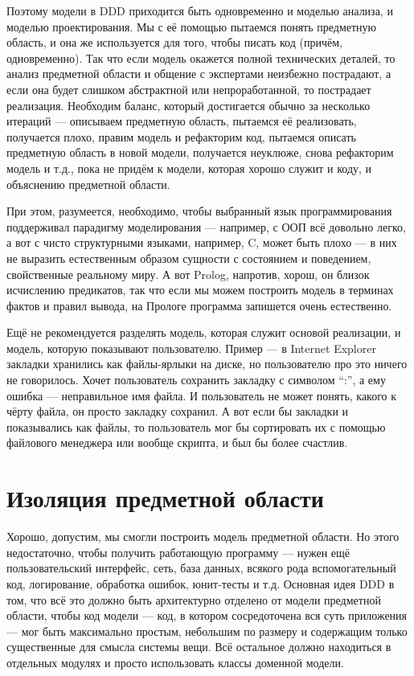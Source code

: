 \documentclass{../../text-style}
\begin{document}
Поэтому модели в DDD приходится быть одновременно и моделью анализа, и моделью проектирования. Мы с её помощью пытаемся понять предметную область, и она же используется для того, чтобы писать код (причём, одновременно). Так что если модель окажется полной технических деталей, то анализ предметной области и общение с экспертами неизбежно пострадают, а если она будет слишком абстрактной или непроработанной, то пострадает реализация. Необходим баланс, который достигается обычно за несколько итераций --- описываем предметную область, пытаемся её реализовать, получается плохо, правим модель и рефакторим код, пытаемся описать предметную область в новой модели, получается неуклюже, снова рефакторим модель и т.д., пока не придём к модели, которая хорошо служит и коду, и объяснению предметной области. 

При этом, разумеется, необходимо, чтобы выбранный язык программирования поддерживал парадигму моделирования --- например, с ООП всё довольно легко, а вот с чисто структурными языками, например, C, может быть плохо --- в них не выразить естественным образом сущности с состоянием и поведением, свойственные реальному миру. А вот Prolog, напротив, хорош, он близок исчислению предикатов, так что если мы можем построить модель в терминах фактов и правил вывода, на Прологе программа запишется очень естественно.

Ещё не рекомендуется разделять модель, которая служит основой реализации, и модель, которую показывают пользователю. Пример --- в Internet Explorer закладки хранились как файлы-ярлыки на диске, но пользователю про это ничего не говорилось. Хочет пользователь сохранить закладку с символом ``:'', а ему ошибка --- неправильное имя файла. И пользователь не может понять, какого к чёрту файла, он просто закладку сохранил. А вот если бы закладки и показывались как файлы, то пользователь мог бы сортировать их с помощью файлового менеджера или вообще скрипта, и был бы более счастлив.

\section{Изоляция предметной области}

Хорошо, допустим, мы смогли построить модель предметной области. Но этого недостаточно, чтобы получить работающую программу --- нужен ещё пользовательский интерфейс, сеть, база данных, всякого рода вспомогательный код, логирование, обработка ошибок, юнит-тесты и т.д. Основная идея DDD в том, что всё это должно быть архитектурно отделено от модели предметной области, чтобы код модели --- код, в котором сосредоточена вся суть приложения --- мог быть максимально простым, небольшим по размеру и содержащим только существенные для смысла системы вещи. Всё остальное должно находиться в отдельных модулях и просто использовать классы доменной модели.
\end{document}
